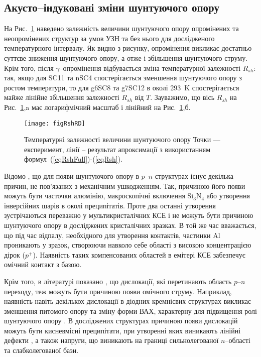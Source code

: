 \subsection{Акусто--індуковані зміни шунтуючого опору\label{sbRsh}}

На Рис.~\ref{figRshRD} наведено залежність величини шунтуючого опору опромінених та неопромінених структур
за умов УЗН та без нього для дослідженого температурного інтервалу.
Як видно з рисунку, опромінення викликає достатньо суттєве зниження шунтуючого опору, а отже
і збільшення шунтуючого струму.
Крім того, після $\gamma$--опромінення відбувається зміна температурної залежності $R_{sh}$:
так, якщо для SC11 та nSC4 спостерігається зменшення шунтуючого опору з ростом температури,
то для g6SC8 та g7SC12 в околі 293~K спостерігається майже лінійне збільшення залежності
$R_{sh}$ від $T$.
Зауважимо, що вісь $R_{sh}$ на Рис.~\ref{figRshRD},a має логарифмічний масштаб і лінійний на  Рис.~\ref{figRshRD},б.


\begin{figure}
\center
\texttt{[image: figRshRD]}
\caption{\label{figRshRD}
Температурні залежності величини шунтуючого опору
\FigCaptionSSCRD
Точки --- експеримент,
лінії -- результат апроксимації з використанням формул~(\ref{eqRshFull})-(\ref{eqRsh}).
}%
\end{figure}

Відомо \cite{Rsh:Breitenstein,RshMet}, що для появи шунтуючого опору в $p$--$n$ структурах існує декілька причин, не
пов'язаних з механічним ушкодженням.
Так, причиною його появи можуть бути часточки алюмінію, макроскопічні включення Si$_3$N$_4$ або утворення інверсійних шарів
в околі преципітатів.
Проте два останні утворення зустрічаються переважно у мультикристалічних КСЕ \cite{Rsh:Breitenstein} і не можуть
бути причиною шунтуючого опору в досліджених кристалічних зразках.
В той же час вважається, що під час відпалу, необхідного для утворення контактів, частинки Al проникають у зразок,
створюючи навколо себе області з високою концентрацією дірок ($p^+$).
Наявність таких компенсованих областей в емітері КСЕ  забезпечує омічний контакт з базою.

Крім того, в літературі показано \cite{Rsh:Breitenstein,TAT:Gopal,Rsh:Baker,Si:dislIV},
що дислокації, які перетинають область $p$--$n$ переходу, теж можуть бути причиною появи омічного струму.
Наприклад, наявність навіть декількох дислокації в діодних кремнієвих структурах викликає зменшення питомого опору
та зміну форми ВАХ, характерну для підвищення ролі шунтуючого опору \cite{Si:dislIV}.
В досліджених структурах причиною появи дислокацій можуть бути кисневмісні преципітати, при утворенні яких
виникають лінійні дефекти \cite{SiO:Hwang,SiO:Vanhell}, а також напруги, що виникають
на границі сильнолегованої $n$--області та слабколегованої бази.

